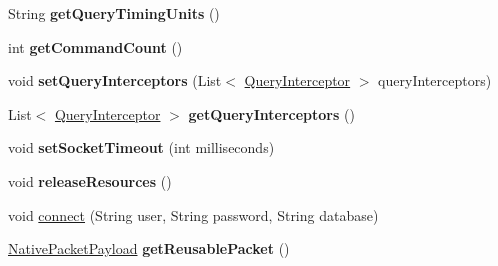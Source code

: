 \begin{DoxyCompactItemize}
\mbox{\label{classcom_1_1mysql_1_1cj_1_1protocol_1_1a_1_1_native_protocol_a64f116119e9dc3ab702d1b15e4a18c54}} 
String {\bfseries get\+Query\+Timing\+Units} ()
\item 
\mbox{\label{classcom_1_1mysql_1_1cj_1_1protocol_1_1a_1_1_native_protocol_ad6bcb856be81eab8d103631d4479dfc8}} 
int {\bfseries get\+Command\+Count} ()
\item 
\mbox{\label{classcom_1_1mysql_1_1cj_1_1protocol_1_1a_1_1_native_protocol_ac90258dbc58a891639d6a2c15c77de67}} 
void {\bfseries set\+Query\+Interceptors} (List$<$ \mbox{\hyperlink{interfacecom_1_1mysql_1_1cj_1_1interceptors_1_1_query_interceptor}{Query\+Interceptor}} $>$ query\+Interceptors)
\item 
\mbox{\label{classcom_1_1mysql_1_1cj_1_1protocol_1_1a_1_1_native_protocol_ad86ce2b8286a798c9408508217fb908b}} 
List$<$ \mbox{\hyperlink{interfacecom_1_1mysql_1_1cj_1_1interceptors_1_1_query_interceptor}{Query\+Interceptor}} $>$ {\bfseries get\+Query\+Interceptors} ()
\item 
\mbox{\label{classcom_1_1mysql_1_1cj_1_1protocol_1_1a_1_1_native_protocol_ab6cb784afa306e310da731783c3ff602}} 
void {\bfseries set\+Socket\+Timeout} (int milliseconds)
\item 
\mbox{\label{classcom_1_1mysql_1_1cj_1_1protocol_1_1a_1_1_native_protocol_a1466aafc5b09d27d6df89546954154d7}} 
void {\bfseries release\+Resources} ()
\item 
void \mbox{\hyperlink{classcom_1_1mysql_1_1cj_1_1protocol_1_1a_1_1_native_protocol_ad567528560d84a107a288dd1c08fb9ce}{connect}} (String user, String password, String database)
\item 
\mbox{\label{classcom_1_1mysql_1_1cj_1_1protocol_1_1a_1_1_native_protocol_a0740b0da6d971cff9f66cfd9e4414511}} 
\mbox{\hyperlink{classcom_1_1mysql_1_1cj_1_1protocol_1_1a_1_1_native_packet_payload}{Native\+Packet\+Payload}} {\bfseries get\+Reusable\+Packet} ()

\end{DoxyCompactItemize}

